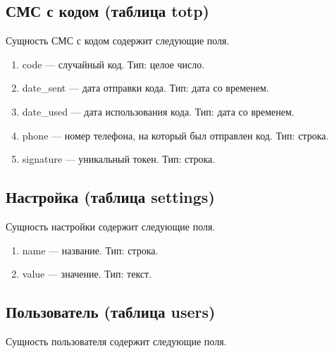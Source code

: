 \subsection{СМС с кодом (таблица totp)}

Сущность СМС с кодом содержит следующие поля.

\begin{enumerate}
    \item code --- случайный код. Тип: целое число. 
    \item date\_sent --- дата отправки кода. Тип: дата со временем. 
    \item date\_used --- дата использования кода. Тип: дата со временем.
    \item phone --- номер телефона, на который был отправлен код. Тип: строка. 
    \item signature --- уникальный токен. Тип: строка. 
\end{enumerate}

\subsection{Настройка (таблица settings)}

Сущность настройки содержит следующие поля.

\begin{enumerate}
    \item name --- название. Тип: строка.
    \item value --- значение. Тип: текст.
\end{enumerate}

\subsection{Пользователь (таблица users)}

Сущность пользователя содержит следующие поля.

